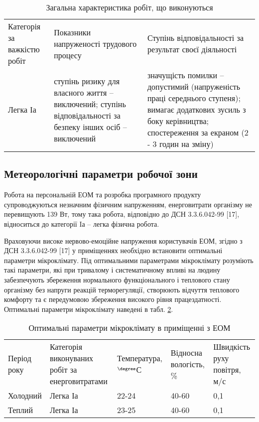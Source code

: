 \begin{table}[h]
	\captionstyle{ \raggedright}
	\caption{Загальна характеристика робіт, що виконуються}\label{tab:charrobit}
	\begin{tabular}{|m{}|m{}|m{}|}
		\hline
		Категорія за важкістю робіт & Показники напруженості трудового процесу & Ступінь відповідальності за результат своєї діяльності \\
		\hlinewd{2pt}
		Легка Іа & ступінь ризику для власного життя – виключений; ступінь відповідальності за безпеку інших осіб – виключений & значущість помилки –  допустимий (напруженість праці середнього ступеня); вимагає додаткових зусиль з боку керівництва; спостереження за екраном (2 - 3 годин на зміну) \\
		\hline
	\end{tabular}
\end{table}

\subsection{Метеорологічні параметри робочої зони}

Робота на персональній ЕОМ та розробка програмного продукту супроводжуються незначним фізичним напруженням, енерговитрати організму не перевищують 139 Вт, тому така робота, відповідно до ДСН 3.3.6.042-99 [17],  відноситься до категорії Iа – легка фізична робота.

Враховуючи високе нервово-емоційне напруження користувачів ЕОМ, згідно з ДСН 3.3.6.042-99 [17] у приміщеннях необхідно встановити оптимальні параметри мікроклімату. Під оптимальними параметрами мікроклімату розуміють такі параметри, які при тривалому і систематичному впливі на людину забезпечують збереження нормального функціонального і теплового стану організму без напруги реакцій терморегуляції, створюють відчуття теплового комфорту та є передумовою збереження високого рівня працездатності. Оптимальні параметри мікроклімату наведені в табл. \ref{tab:optclim}.

\begin{table}[h]
	\captionstyle{ \raggedright}
	\caption{Оптимальні параметри мікроклімату в приміщенні з ЕОМ}\label{tab:optclim}
	\begin{tabular}{|m{}|m{}|m{}|m{}|m{}|}
		\hline
		Період року & Категорія виконуваних робіт за енерговитратами & Температура, $^{\degree}$С & Відносна вологість, \% & Швидкість руху повітря, м/с \\
		\hlinewd{2pt}
		Холодний & Легка Іа & 22-24 & 40-60 & 0,1 \\
		\hline
		Теплий & Легка Іа & 23-25 & 40-60 & 0,1 \\
		\hline
	\end{tabular}
\end{table}

